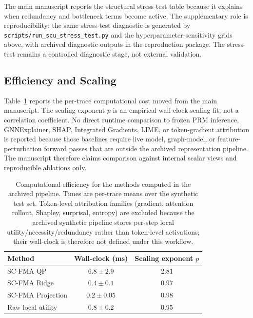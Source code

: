 \documentclass[a4paper,fleqn]{cas-sc}
\begin{document}
The main manuscript reports the structural stress-test table because it explains when redundancy and bottleneck terms become active. The supplementary role is reproducibility: the same stress-test diagnostic is generated by \texttt{scripts/run\_scu\_stress\_test.py} and the hyperparameter-sensitivity grids above, with archived diagnostic outputs in the reproduction package. The stress-test remains a controlled diagnostic stage, not external validation.

\subsection{Efficiency and Scaling}
\label{app:efficiency-scaling}

Table~\ref{tab:supp-efficiency} reports the per-trace computational cost moved from the main manuscript. The scaling exponent $p$ is an empirical wall-clock scaling fit, not a correlation coefficient. No direct runtime comparison to frozen PRM inference, GNNExplainer, SHAP, Integrated Gradients, LIME, or token-gradient attribution is reported because those baselines require live model, graph-model, or feature-perturbation forward passes that are outside the archived representation pipeline. The manuscript therefore claims comparison against internal scalar views and reproducible ablations only.

\begin{table}[ht]
\caption{Computational efficiency for the methods computed in the archived pipeline. Times are per-trace means over the synthetic test set. Token-level attribution families (gradient, attention rollout, Shapley, surprisal, entropy) are excluded because the archived synthetic pipeline stores per-step local utility/necessity/redundancy rather than token-level activations; their wall-clock is therefore not defined under this workflow.}
\label{tab:supp-efficiency}
\centering
\small
\begin{tabular}{lcc}
\toprule
\textbf{Method} & \textbf{Wall-clock (ms)} & \textbf{Scaling exponent $p$} \\
\midrule
SC-FMA QP & $6.8 \pm 2.9$ & 2.81 \\
SC-FMA Ridge & $0.4 \pm 0.1$ & 0.97 \\
SC-FMA Projection & $0.2 \pm 0.05$ & 0.98 \\
Raw local utility & $0.8 \pm 0.2$ & 0.95 \\
\bottomrule
\end{tabular}
\end{table}
\end{document}
